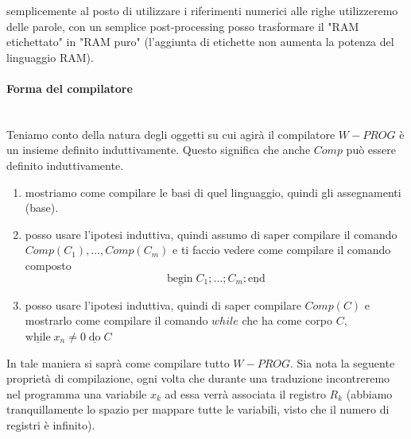 \documentclass{article}
\begin{document}
semplicemente al posto di utilizzare i riferimenti numerici alle righe utilizzeremo delle parole,
con un semplice post-processing posso trasformare il "RAM etichettato" in "RAM puro" (l'aggiunta
di etichette non aumenta la potenza del linguaggio RAM).

\paragraph{Forma del compilatore}\mbox{}\\
Teniamo conto della natura degli oggetti su cui agirà il compilatore $W-PROG$ è un insieme definito
induttivamente. Questo significa che anche $Comp$ può essere definito induttivamente.

\begin{enumerate}
    \item mostriamo come compilare le basi di quel linguaggio, quindi gli assegnamenti (base).
    \item posso usare l'ipotesi induttiva, quindi assumo di saper compilare il comando $Comp(C_1),\dots,Comp(C_m)$ e ti
          faccio vedere come compilare il comando composto
          $$\underline{\text{begin}}\;C_1;\dots ;C_m; \underline{\text{end}}$$
    \item posso usare l'ipotesi induttiva, quindi di saper compilare $Comp(C)$ e mostrarlo come compilare il comando
          $while$ che ha come corpo $C$, $\underline{\text{while}}\;x_n\neq 0\;\underline{\text{do}}\;C$
\end{enumerate}

In tale maniera si saprà come compilare tutto $W-PROG$. Sia nota la seguente proprietà di compilazione,
ogni volta che durante una traduzione incontreremo nel programma una variabile $x_k$ ad essa verrà
associata il registro $R_k$ (abbiamo tranquillamente lo spazio per mappare tutte le variabili, visto
che il numero di registri è infinito).
\end{document}
